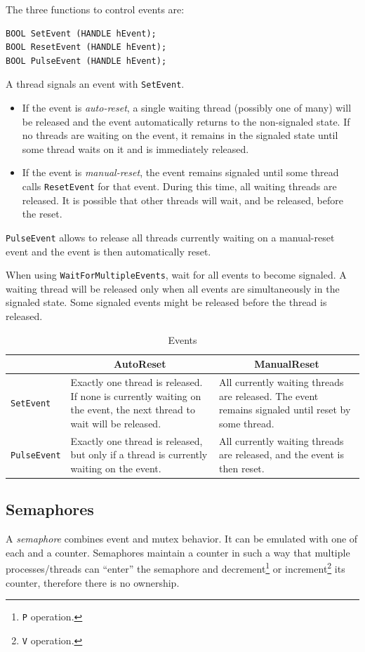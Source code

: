 \medskip
The three functions to control events are:
\begin{verbatim}
BOOL SetEvent (HANDLE hEvent);
BOOL ResetEvent (HANDLE hEvent);
BOOL PulseEvent (HANDLE hEvent);
\end{verbatim}
A thread signals an event with \texttt{SetEvent}.
\begin{itemize}
\item If the event is \textit{auto-reset}, a single waiting thread (possibly one of many) will be released and the event automatically returns to the non-signaled state. If no threads are waiting on the event, it remains in the signaled state until some thread waits on it and is immediately released.
\item If the event is \textit{manual-reset}, the event remains signaled until some thread calls \texttt{ResetEvent} for that event. During this time, all waiting threads are released. It is possible that other threads will wait, and be released, before the reset.
\end{itemize}

\texttt{PulseEvent} allows to release all threads currently waiting on a manual-reset event and the event is then automatically reset.

When using \texttt{WaitForMultipleEvents}, wait for all events to become signaled. A waiting thread will be released only when all events are simultaneously in the signaled state. Some signaled events might be released before the thread is released.

\begin{table}
\centering
\begin{tabularx}{\textwidth}{|l|X|X|}
\hline
& \multicolumn{1}{c|}{AutoReset} & \multicolumn{1}{c|}{ManualReset} \\
\hline
\texttt{SetEvent} & Exactly one thread is released. If none is currently waiting on the event, the next thread to wait will be released. & All currently waiting threads are released. The event remains signaled until reset by some thread. \\
\hline
\texttt{PulseEvent} & Exactly one thread is released, but only if a thread is currently waiting on the event. & All currently waiting threads are released, and the event is then reset. \\
\hline
\end{tabularx}
\caption{Events}
\end{table}

\subsection{Semaphores}
A \emph{semaphore} combines event and mutex behavior. It can be emulated with one of each and a counter. Semaphores maintain a counter in such a way that multiple processes/threads can ``enter'' the semaphore and decrement\footnote{\texttt{P} operation.} or increment\footnote{\texttt{V} operation.} its counter, therefore there is no ownership.

